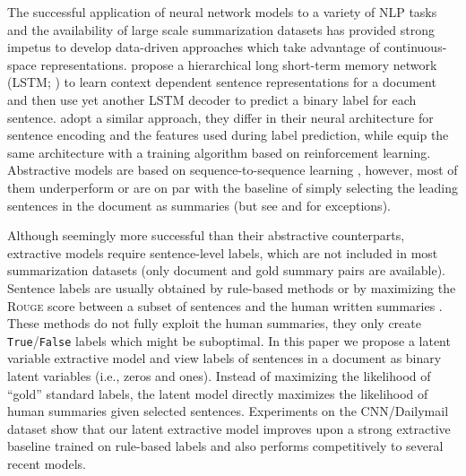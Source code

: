 \documentclass[11pt,a4paper]{article}
\begin{document}
The successful application of neural network models to a variety of
NLP tasks and the availability of large scale summarization datasets
\cite{hermann:2015:nips,nallapati:2016:arxiv} has provided strong
impetus to develop data-driven approaches which take advantage of
continuous-space representations.   propose a
hierarchical long short-term memory network (LSTM;
\citealt{hochreiter:1997:nc}) to learn context dependent sentence
representations for a document and then use yet another LSTM decoder
to predict a binary label for each
sentence.  adopt a similar approach, they
differ in their neural architecture for sentence encoding and the
features used during label prediction, while \citet{Narayan:ea:2018}
equip the same architecture with a training algorithm based on
reinforcement learning.  Abstractive models
\cite{nallapati:2016:arxiv,see:2017:acl,paulus:2017:arxiv} are based
on sequence-to-sequence learning
\cite{sutskever:2014:nips,bahdanau:2015:iclr}, however, most of them
underperform or are on par with the baseline of simply selecting the
leading sentences in the document as summaries (but see
\citealt{paulus:2017:arxiv} and \citealt{N18-1150} for exceptions).






Although seemingly more successful than their abstractive
counterparts, extractive models require sentence-level labels, which
are not included in most summarization datasets (only document and
gold summary pairs are available). Sentence labels are usually
obtained by rule-based methods \cite{cheng:2016:acl} or by maximizing
the \textsc{Rouge} score \cite{lin:2004:acl:w} between a subset of
sentences and the human written summaries
\cite{nallapati:2017:aaai}. These methods do not fully exploit the
human summaries, they only create {\tt True}/{\tt False} labels which
might be suboptimal.  In this paper we propose a latent variable
extractive model and view labels of sentences in a document as binary
latent variables (i.e., zeros and ones). Instead of maximizing the
likelihood of ``gold'' standard labels, the latent model directly
maximizes the likelihood of human summaries given selected sentences.
Experiments on the CNN/Dailymail dataset \cite{hermann:2015:nips} show
that our latent extractive model improves upon a strong extractive
baseline trained on rule-based labels and also performs competitively
to several recent models.
\end{document}
